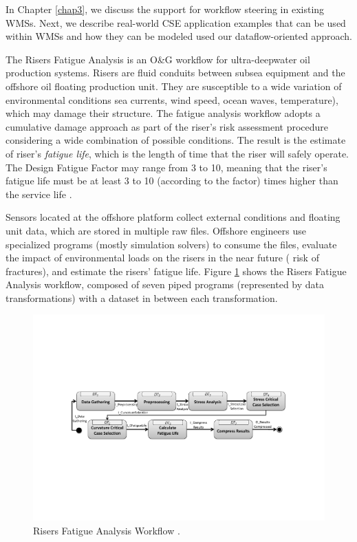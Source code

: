 In Chapter \ref{chap3}, we discuss the support for workflow steering in existing WMSs. Next, we describe real-world CSE application examples that can be used within WMSs and how they can be modeled used our dataflow-oriented approach.

%

 \label{sub_rfa}

The Risers Fatigue Analysis is an O\&G workflow for ultra-deepwater oil production systems.
Risers are fluid conduits between subsea
equipment and the offshore oil floating production unit. They are
susceptible to a wide variation of environmental conditions
\eg{} sea currents, wind speed, ocean waves, temperature), which
may damage their structure. The fatigue analysis workflow adopts a
cumulative damage approach as part of the riser's risk assessment
procedure considering a wide combination of possible conditions. The
result is the estimate of riser's \emph{fatigue life}, which is the
length of time that the riser will safely operate. The Design Fatigue
Factor may range from 3 to 10, meaning that the riser's fatigue
life must be at least 3 to 10 (according to the factor)
 times higher than the service life
\cite{DetNorseVeritas2010Recommended}.

Sensors located at the offshore platform collect external conditions and
floating unit data, which are stored in multiple raw files. Offshore
engineers use specialized programs (mostly simulation solvers) to
consume the files, evaluate the impact of environmental loads on the
risers in the near future (\eg{} risk of fractures), and estimate
the risers' fatigue life. 
Figure \ref{fig:rfa_wf} shows the Risers Fatigue Analysis workflow, composed of seven piped programs (represented by data transformations) with a dataset in between each transformation.

\begin{figure}[H]
    \centering
    \includegraphics[width=\textwidth,keepaspectratio]{img/rfa.pdf}
    \caption{Risers Fatigue Analysis Workflow \cite{DetNorseVeritas2010Recommended}.}
    \label{fig:rfa_wf}
\end{figure}

